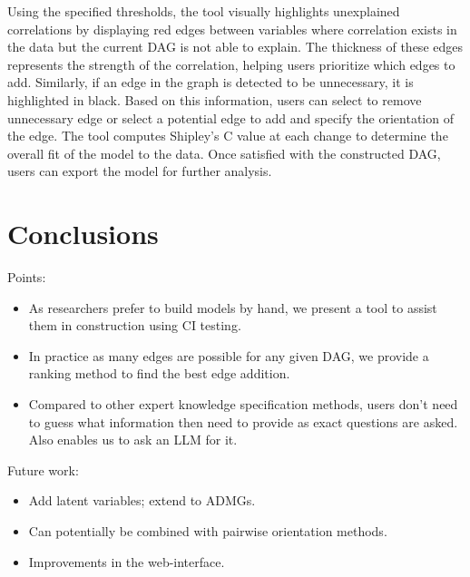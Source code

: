 \documentclass{uai2025} %
\begin{document}
Using the specified thresholds, the tool visually highlights unexplained
correlations by displaying red edges between variables where correlation exists
in the data but the current DAG is not able to explain. The thickness of these
edges represents the strength of the correlation, helping users prioritize
which edges to add. Similarly, if an edge in the graph is detected to be
unnecessary, it is highlighted in black. Based on this information, users can
select to remove unnecessary edge or select a potential edge to add and specify
the orientation of the edge. The tool computes Shipley’s C \citep{Shipley2000}
value at each change to determine the overall fit of the model to the data.
Once satisfied with the constructed DAG, users can export the model for further
analysis.


\section{Conclusions}

Points:
\begin{itemize}
	\item As researchers prefer to build models by hand, we present a tool
		to assist them in construction using CI testing.
	\item In practice as many edges are possible for any given DAG, we provide
		a ranking method to find the best edge addition.
	\item Compared to other expert knowledge specification methods, users
		don't need to guess what information then need to provide as
		exact questions are asked. Also enables us to ask an LLM for
		it.
\end{itemize}

Future work:
\begin{itemize}
	\item Add latent variables; extend to ADMGs.
	\item Can potentially be combined with pairwise orientation methods.
	\item Improvements in the web-interface.
\end{itemize}



\newpage


\end{document}
